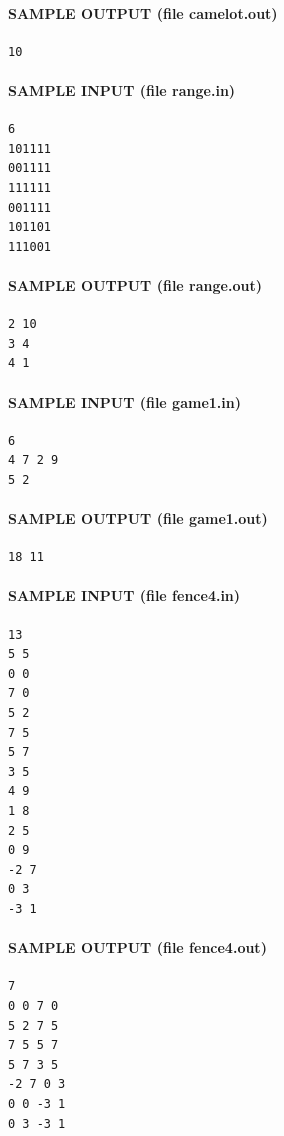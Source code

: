 \documentclass[11pt]{article}
\begin{document}
\paragraph{SAMPLE OUTPUT (file camelot.out)}
\begin{verbatim}
10
\end{verbatim}

\paragraph{SAMPLE INPUT (file range.in)}
\begin{verbatim}
6
101111
001111
111111
001111
101101
111001
\end{verbatim}

\paragraph{SAMPLE OUTPUT (file range.out)}
\begin{verbatim}
2 10
3 4
4 1
\end{verbatim}

\paragraph{SAMPLE INPUT (file game1.in)}
\begin{verbatim}
6
4 7 2 9
5 2
\end{verbatim}

\paragraph{SAMPLE OUTPUT (file game1.out)}
\begin{verbatim}
18 11
\end{verbatim}

\paragraph{SAMPLE INPUT (file fence4.in)}
\begin{verbatim}
13
5 5
0 0
7 0
5 2
7 5
5 7
3 5
4 9
1 8
2 5
0 9
-2 7
0 3
-3 1
\end{verbatim}

\paragraph{SAMPLE OUTPUT (file fence4.out)}
\begin{verbatim}
7
0 0 7 0
5 2 7 5
7 5 5 7
5 7 3 5
-2 7 0 3
0 0 -3 1
0 3 -3 1
\end{verbatim}
\end{document}
